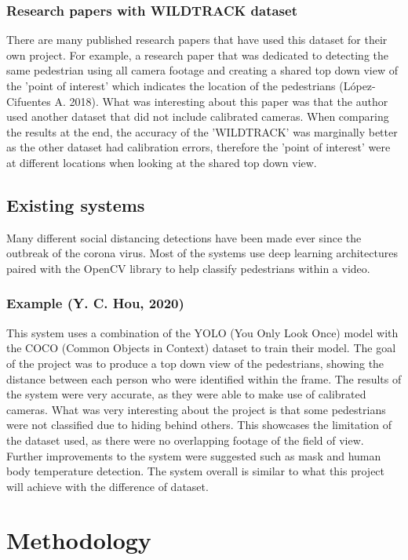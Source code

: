 \documentclass[12pt]{report}
\begin{document}
\subsection{Research papers with WILDTRACK dataset}

There are many published research papers that have used this dataset for their own project. For example, a research paper that was dedicated to detecting the same pedestrian using all camera footage and creating a shared top down view of the 'point of interest' which indicates the location of the pedestrians (López-Cifuentes A. 2018). What was interesting about this paper was that the author used another dataset that did not include calibrated cameras. When comparing the results at the end, the accuracy of the 'WILDTRACK' was marginally better as the other dataset had calibration errors, therefore the 'point of interest' were at different locations when looking at the shared top down view.


\section{Existing systems}

Many different social distancing detections have been made ever since the outbreak of the corona virus. Most of the systems use deep learning architectures paired with the OpenCV library to help classify pedestrians within a video.

\subsection{Example (Y. C. Hou, 2020)}

This system uses a combination of the YOLO (You Only Look Once) model with the COCO (Common Objects in Context) dataset to train their model. The goal of the project was to produce a top down view of the pedestrians, showing the distance between each person who were identified within the frame. The results of the system were very accurate, as they were able to make use of calibrated cameras. What was very interesting about the project is that some pedestrians were not classified due to hiding behind others. This showcases the limitation of the dataset used, as there were no overlapping footage of the field of view. Further improvements to the system were suggested such as mask and human body temperature detection. The system overall is similar to what this project will achieve with the difference of dataset.

\chapter{Methodology}
\end{document}
